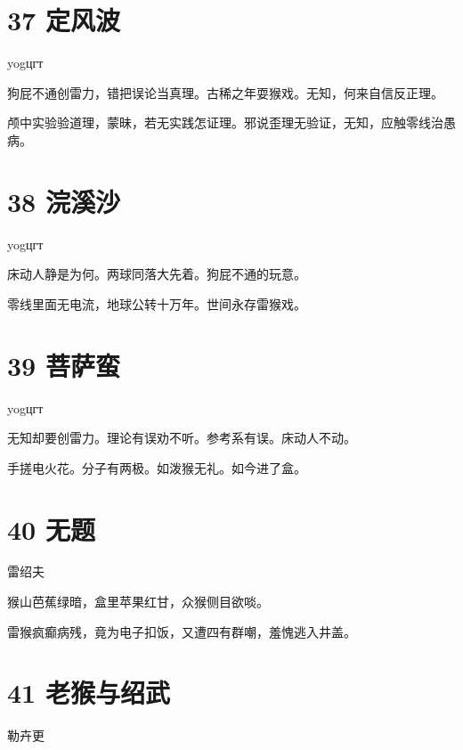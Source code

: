 \documentclass[UTF8,12pt,oneside]{ctexbook}
\begin{document}
        \section{37 定风波}
        \begin{center}
            yogцгт
        \end{center}
        
        狗屁不通创雷力，错把误论当真理。古稀之年耍猴戏。无知，何来自信反正理。
        
        颅中实验验道理，蒙昧，若无实践怎证理。邪说歪理无验证，无知，应触零线治愚病。
        ~\\
        
        \section{38 浣溪沙}
        \begin{center}
            yogцгт
        \end{center}
        
        床动人静是为何。两球同落大先着。狗屁不通的玩意。
        
        零线里面无电流，地球公转十万年。世间永存雷猴戏。
        ~\\
        
        \section{39 菩萨蛮}
        \begin{center}
            yogцгт
        \end{center}
        
        无知却要创雷力。理论有误劝不听。参考系有误。床动人不动。
        
        手搓电火花。分子有两极。如泼猴无礼。如今进了盒。
        
        \newpage
        
        \section{40 无题}
        \begin{center}
            雷绍夫
        \end{center}
        
        猴山芭蕉绿暗，盒里苹果红甘，众猴侧目欲啖。
        
        雷猴疯癫病残，竟为电子扣饭，又遭四有群嘲，羞愧逃入井盖。
        
        \section{41 老猴与绍武}
        \begin{center}
            勒卉更
        \end{center}
        
\end{document}
